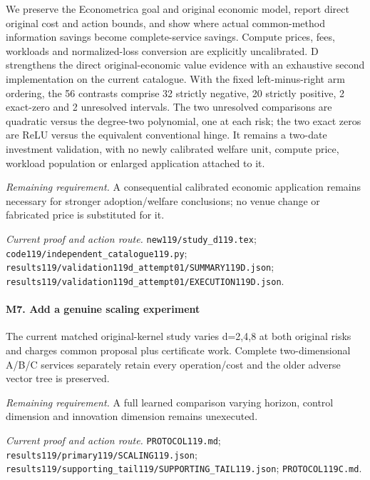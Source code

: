 We preserve the Econometrica goal and original economic model, report direct original cost and action bounds, and show where actual common-method information savings become complete-service savings. Compute prices, fees, workloads and normalized-loss conversion are explicitly uncalibrated. D strengthens the direct original-economic value evidence with an exhaustive second implementation on the current catalogue. With the fixed left-minus-right arm ordering, the 56 contrasts comprise 32 strictly negative, 20 strictly positive, 2 exact-zero and 2 unresolved intervals. The two unresolved comparisons are quadratic versus the degree-two polynomial, one at each risk; the two exact zeros are ReLU versus the equivalent conventional hinge. It remains a two-date investment validation, with no newly calibrated welfare unit, compute price, workload population or enlarged application attached to it.

\par\emph{Remaining requirement.} A consequential calibrated economic application remains necessary for stronger adoption/\allowbreak{}welfare conclusions; no venue change or fabricated price is substituted for it.

\par\emph{Current proof and action route.} \nolinkurl{new119/study_d119.tex}; \nolinkurl{code119/independent_catalogue119.py}; \nolinkurl{results119/validation119d_attempt01/SUMMARY119D.json}; \nolinkurl{results119/validation119d_attempt01/EXECUTION119D.json}.

\paragraph{M7. Add a genuine scaling experiment}

The current matched original-kernel study varies d=2,4,8 at both original risks and charges common proposal plus certificate work. Complete two-dimensional A/\allowbreak{}B/\allowbreak{}C services separately retain every operation/\allowbreak{}cost and the older adverse vector tree is preserved.

\par\emph{Remaining requirement.} A full learned comparison varying horizon, control dimension and innovation dimension remains unexecuted.

\par\emph{Current proof and action route.} \nolinkurl{PROTOCOL119.md}; \nolinkurl{results119/primary119/SCALING119.json}; \nolinkurl{results119/supporting_tail119/SUPPORTING_TAIL119.json}; \nolinkurl{PROTOCOL119C.md}.

